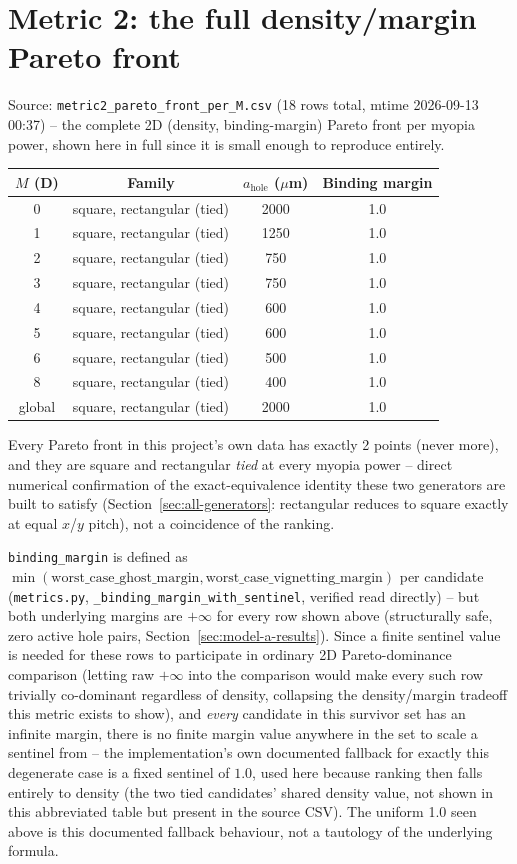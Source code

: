 \section{Metric 2: the full density/margin Pareto front}
\label{sec:metric2-full}
Source: \texttt{metric2\_pareto\_front\_per\_M.csv} (18 rows total, mtime 2026-09-13
00:37) -- the complete 2D (density, binding-margin) Pareto front per myopia power, shown
here in full since it is small enough to reproduce entirely.
\begin{center}
\begin{tabular}{cccc}
\toprule
$M$ (D) & Family & $a_{\mathrm{hole}}$ ($\mu$m) & Binding margin \\
\midrule
0 & square, rectangular (tied) & 2000 & 1.0 \\
1 & square, rectangular (tied) & 1250 & 1.0 \\
2 & square, rectangular (tied) & 750 & 1.0 \\
3 & square, rectangular (tied) & 750 & 1.0 \\
4 & square, rectangular (tied) & 600 & 1.0 \\
5 & square, rectangular (tied) & 600 & 1.0 \\
6 & square, rectangular (tied) & 500 & 1.0 \\
8 & square, rectangular (tied) & 400 & 1.0 \\
global & square, rectangular (tied) & 2000 & 1.0 \\
\bottomrule
\end{tabular}
\end{center}
Every Pareto front in this project's own data has exactly 2 points (never more), and
they are square and rectangular \emph{tied} at every myopia power -- direct numerical
confirmation of the exact-equivalence identity these two generators are built to
satisfy (Section~\ref{sec:all-generators}: rectangular reduces to square exactly at
equal $x$/$y$ pitch), not a coincidence of the ranking.

\texttt{binding\_margin} is defined as $\min(\text{worst\_case\_ghost\_margin},\allowbreak
\text{worst\_case\_vignetting\_margin})$ per candidate (\texttt{metrics.py},
\texttt{\_binding\_margin\_with\_sentinel}, verified read directly) -- but both
underlying margins are $+\infty$ for every row shown above (structurally safe, zero
active hole pairs, Section~\ref{sec:model-a-results}). Since a finite sentinel value is
needed for these rows to participate in ordinary 2D Pareto-dominance comparison
(letting raw $+\infty$ into the comparison would make every such row trivially
co-dominant regardless of density, collapsing the density/margin tradeoff this metric
exists to show), and \emph{every} candidate in this survivor set has an infinite
margin, there is no finite margin value anywhere in the set to scale a sentinel from --
the implementation's own documented fallback for exactly this degenerate case is a
fixed sentinel of $1.0$, used here because ranking then falls entirely to density (the
two tied candidates' shared density value, not shown in this abbreviated table but
present in the source CSV). The uniform 1.0 seen above is this documented fallback
behaviour, not a tautology of the underlying formula.
